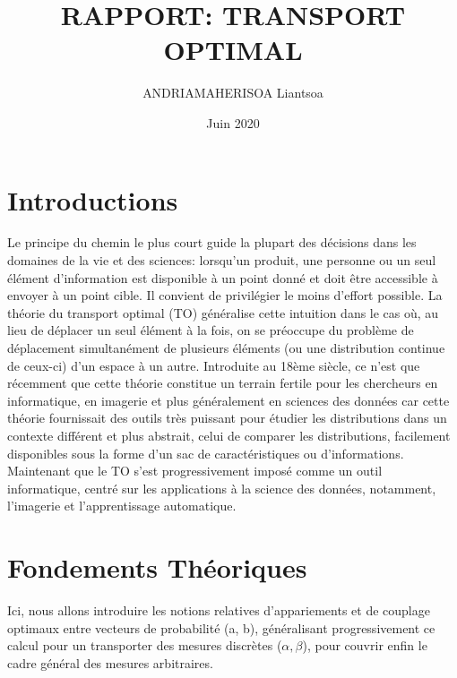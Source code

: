 \documentclass[a4paper,8pt,twocolumn]{article}
\title{RAPPORT: TRANSPORT OPTIMAL}
\author{ANDRIAMAHERISOA Liantsoa}
\date{Juin 2020}
\begin{document}
\begin{titlepage}
\maketitle
\end{titlepage}
\section{Introductions}
    Le principe du chemin le plus court guide la plupart des décisions dans les domaines de la vie et des sciences: lorsqu’un produit, une personne ou un seul élément d’information est disponible à un point donné et doit être accessible à envoyer à un point cible. Il convient de privilégier le moins d’effort possible.  La théorie du transport optimal (TO) généralise cette intuition dans le cas où, au lieu de déplacer un seul élément à la fois, on se préoccupe du problème de déplacement simultanément de plusieurs éléments (ou une distribution continue de ceux-ci) d’un espace à un autre. \newline Introduite au 18ème siècle, ce n’est que récemment que cette théorie constitue un terrain fertile pour les chercheurs en informatique, en imagerie et plus généralement en sciences des données car cette théorie fournissait des outils très puissant pour étudier les distributions dans un contexte différent et plus abstrait, celui de comparer les distributions, facilement disponibles sous la forme d’un sac de caractéristiques ou d’informations. Maintenant que le TO s’est progressivement imposé comme un outil informatique, centré sur les applications à la science des données, notamment, l’imagerie et l’apprentissage automatique.
\section{Fondements Théoriques}
    Ici, nous allons introduire les notions relatives d’appariements et de couplage optimaux entre vecteurs de probabilité (a, b), généralisant progressivement ce calcul pour un transporter des mesures discrètes  ($\alpha, \beta$), pour couvrir enfin le cadre général des mesures arbitraires.
\end{document}

